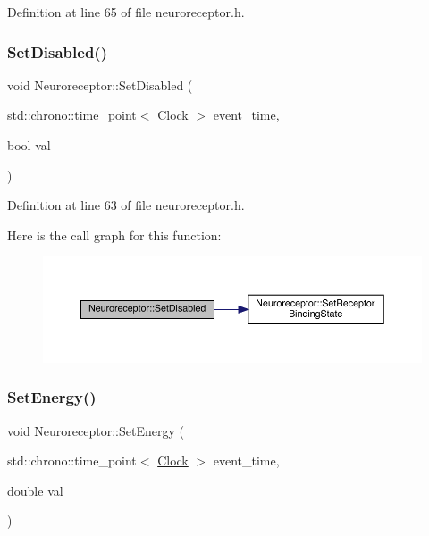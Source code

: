 Definition at line 65 of file neuroreceptor.\+h.

\mbox{\label{class_neuroreceptor_aeec8bb2442e04700d4e9d80bb2d6e47e}} 
\subsubsection{\texorpdfstring{Set\+Disabled()}{SetDisabled()}}
{\footnotesize\ttfamily void Neuroreceptor\+::\+Set\+Disabled (\begin{DoxyParamCaption}\item[{std\+::chrono\+::time\+\_\+point$<$ \hyperlink{universe_8h_a0ef8d951d1ca5ab3cfaf7ab4c7a6fd80}{Clock} $>$}]{event\+\_\+time,  }\item[{bool}]{val }\end{DoxyParamCaption})\hspace{0.3cm}{\ttfamily [inline]}}



Definition at line 63 of file neuroreceptor.\+h.

Here is the call graph for this function\+:\nopagebreak
\begin{figure}[H]
\begin{center}
\leavevmode
\includegraphics[width=350pt]{class_neuroreceptor_aeec8bb2442e04700d4e9d80bb2d6e47e_cgraph}
\end{center}
\end{figure}
\mbox{\label{class_neuroreceptor_ac1189f9c40e3cd07e4b1dc11115ad882}} 
\subsubsection{\texorpdfstring{Set\+Energy()}{SetEnergy()}}
{\footnotesize\ttfamily void Neuroreceptor\+::\+Set\+Energy (\begin{DoxyParamCaption}\item[{std\+::chrono\+::time\+\_\+point$<$ \hyperlink{universe_8h_a0ef8d951d1ca5ab3cfaf7ab4c7a6fd80}{Clock} $>$}]{event\+\_\+time,  }\item[{double}]{val }\end{DoxyParamCaption})\hspace{0.3cm}{\ttfamily [inline]}}



